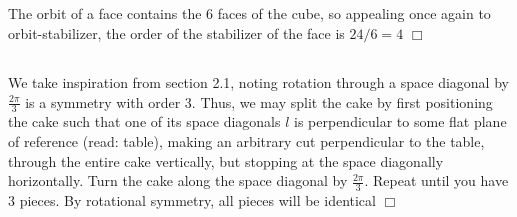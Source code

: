 \documentclass{article}
\begin{document}
\subsection{}
The orbit of a face contains the 6 faces of the cube, so appealing once again to orbit-stabilizer, the order of the stabilizer of the face is $24/6 = 4$ $\Box$

\subsection{}
We take inspiration from section 2.1, noting rotation through a space diagonal by $\frac{2\pi}{3}$ is a symmetry with order 3. Thus, we may split the cake by first positioning the cake such that one of its space diagonals $l$ is perpendicular to some flat plane of reference (read: table), making an arbitrary cut perpendicular to the table, through the entire cake vertically, but stopping at the space diagonally horizontally. Turn the cake along the space diagonal by $\frac{2\pi}{3}$. Repeat until you have 3 pieces. By rotational symmetry, all pieces will be identical $\Box$
\end{document}
